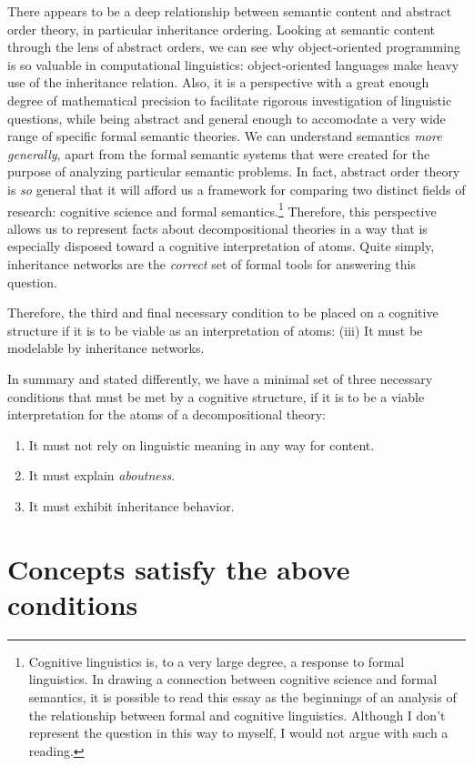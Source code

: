 \documentclass[12pt]{amsart}
\begin{document}
There appears to be a deep relationship between semantic content and abstract order theory, in particular inheritance ordering. Looking at semantic content through the lens of abstract orders, we can see why object-oriented programming is so valuable in computational linguistics: object-oriented languages make heavy use of the inheritance relation. Also, it is a perspective with a great enough degree of mathematical precision to facilitate rigorous investigation of linguistic questions, while being abstract and general enough to accomodate a very wide range of specific formal semantic theories. We can understand semantics \emph{more generally}, apart from the formal semantic systems that were created for the purpose of analyzing particular semantic problems. In fact, abstract order theory is \emph{so} general that it will afford us a framework for comparing two distinct fields of research: cognitive science and formal semantics.\footnote{Cognitive linguistics is, to a very large degree, a response to formal linguistics. In drawing a connection between cognitive science and formal semantics, it is possible to read this essay as the beginnings of an analysis of the relationship between formal and cognitive linguistics. Although I don't represent the question in this way to myself, I would not argue with such a reading.} Therefore, this perspective allows us to represent facts about decompositional theories in a way that is especially disposed toward a cognitive interpretation of atoms. Quite simply, inheritance networks are the \emph{correct} set of formal tools for answering this question.

Therefore, the third and final necessary condition to be placed on a cognitive structure if it is to be viable as an interpretation of atoms: (iii) It must be modelable by inheritance networks.

In summary and stated differently, we have a minimal set of three necessary conditions that must be met by a cognitive structure, if it is to be a viable interpretation for the atoms of a decompositional theory:
\begin{enumerate}[(i$^\prime$)]
\item It must not rely on linguistic meaning in any way for content.
\item It must explain \emph{aboutness}.
\item It must exhibit inheritance behavior.
\end{enumerate}

\section{Concepts satisfy the above conditions}
\end{document}
